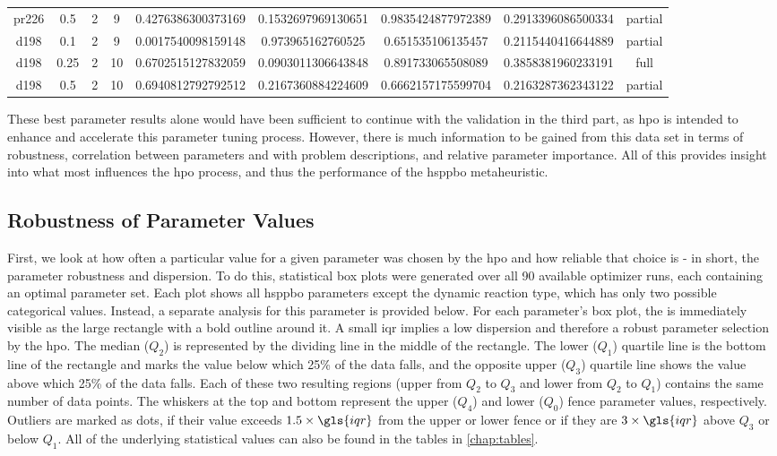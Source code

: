\begin{table}[h]
\begin{tabular}{cc | ccccccc}
		pr226 & 0.5 & 2 & 9 & \num{0.4276386300373169} & \num{0.1532697969130651} & \num{0.9835424877972389} & \num{0.2913396086500334} & partial \\ 
		d198 & 0.1 & 2 & 9 & \num{0.0017540098159148} & \num{0.973965162760525} & \num{0.651535106135457} & \num{0.2115440416644889} & partial \\ 
		d198 & 0.25 & 2 & 10 & \num{0.6702515127832059} & \num{0.0903011306643848} & \num{0.891733065508089} & \num{0.3858381960233191} & full \\ 
		d198 & 0.5 & 2 & 10 & \num{0.6940812792792512} & \num{0.2167360884224609} & \num{0.6662157175599704} & \num{0.2163287362343122} & partial \\ \hline
	\end{tabular}
\end{table}

These best parameter results alone would have been sufficient to continue with the validation in the third part, as \gls{hpo} is intended to enhance and accelerate this parameter tuning process. However, there is much information to be gained from this data set in terms of robustness, correlation between parameters and with problem descriptions, and relative parameter importance. All of this provides insight into what most influences the \gls{hpo} process, and thus the performance of the \gls{hsppbo} metaheuristic.

\subsection{Robustness of Parameter Values}
\label{chap:robustness}

First, we look at how often a particular value for a given parameter was chosen by the \gls{hpo} and how reliable that choice is  - in short, the parameter robustness and dispersion. To do this, statistical box plots were generated over all 90 available optimizer runs, each containing an optimal parameter set. Each plot shows all \gls{hsppbo} parameters except the dynamic reaction type, which has only two possible categorical values. Instead, a separate analysis for this parameter is provided below. For each parameter's box plot, the  is immediately visible as the large rectangle with a bold outline around it. A small \gls{iqr} implies a low dispersion and therefore a robust parameter selection by the \gls{hpo}. 
The median ($Q_2$) is represented by the dividing line in the middle of the rectangle. The lower ($Q_1$) quartile line is the bottom line of the rectangle and marks the value below which 25\% of the data falls, and the opposite upper ($Q_3$) quartile line shows the value above which 25\% of the data falls. Each of these two resulting regions (upper from $Q_2$ to $Q_3$ and lower from $Q_2$ to $Q_1$) contains the same number of data points. The whiskers at the top and bottom represent the upper ($Q_4$) and lower ($Q_0$) fence parameter values, respectively. Outliers are marked as dots, if their value exceeds $1.5 \times \gls{iqr}$ from the upper or lower fence or if they are $3 \times \gls{iqr}$ above $Q_3$ or below $Q_1$. All of the underlying statistical values can also be found in the tables in \cref{chap:tables}.

